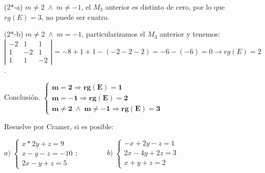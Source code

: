 \begin{proofw}
(2*-a) $m\neq 2 \; \wedge \; m\neq -1$, el $M_3$ anterior es distinto de cero, por lo que $rg(E)=3$, no puede ser cuatro.

(2*-b) $m\neq 2 \; \wedge \; m=-1$, particularizamos el $M_3$ anterior y tenemos: $\left| \begin{matrix} -2&1&1\\1&-2&1\\1&1&-2 \end{matrix} \right|=-8+1+1-(-2-2-2)=-6-(-6)=0 \to rg(E)=2$.

Conclusión. $\begin{cases} 
\boldsymbol{m=2\Rightarrow rg(E)=1} \\ 
\boldsymbol{m=-1 \Rightarrow rg(E)=2} \\ 
\boldsymbol{m\neq 2 \; \wedge \; m\neq -1 \Rightarrow rg(E)=3}    \end{cases}$

\end{proofw}

\begin{ejre}
	Resuelve por Cramer, si es posible:
	
 $a)\; \begin{cases} x*2y+z=9\\x-y-z=-10\\2x-y+z=5  \end{cases}; \qquad \qquad b)\; \begin{cases} -x+2y-z=1\\2x-4y+2z=3\\x+y+z=2  \end{cases}$
 
 \end{ejre}
 
